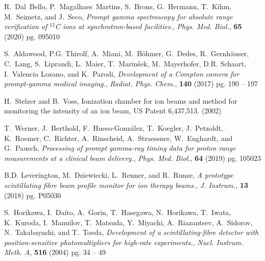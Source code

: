 \documentclass[a4paper,11pt]{article}
\begin{document}
\begin{thebibliography}{99}
R.~Dal~Bello, P.~Magalhaes~Martins, S.~Brons, G.~Hermann, T.~Kihm, M.~Seimetz, and J.~Seco, \emph{Prompt gamma spectroscopy for absolute range verification of $^{12}${C} ions at synchrotron-based facilities.}, \emph{Phys. Med. Biol.}, \textbf{65} (2020) pg. 095010

S.~Aldawood, P.G. Thirolf, A.~Miani, M.~Böhmer, G.~Dedes, R.~Gernhäuser,
  C.~Lang, S.~Liprandi, L.~Maier, T.~Marinšek, M.~Mayerhofer, D.R. Schaart,
  I.~Valencia Lozano, and K.~Parodi, \emph{Development of a {C}ompton camera for prompt-gamma medical imaging.}, \emph{Radiat. Phys. Chem.}, \textbf{140} (2017) pg. 190 -- 197

H.~Stelzer and B.~Voss, Ionization chamber for ion beams and method for monitoring the intensity of an ion beam, US Patent 6,437,513. (2002)

T.~Werner, J.~Berthold, F.~Hueso-Gonz{\'{a}}lez, T.~Koegler, J.~Petzoldt,
  K.~Roemer, C.~Richter, A.~Rinscheid, A.~Straessner, W.~Enghardt, and
  G.~Pausch, \emph{Processing of prompt gamma-ray timing data for proton range measurements at a clinical beam delivery.}, \emph{Phys. Med. Biol.}, \textbf{64} (2019) pg. 105023

B.D. Leverington, M.~Dziewiecki, L.~Renner, and R.~Runze, \emph{A prototype scintillating fibre beam profile monitor for ion therapy beams.}, \emph{J. Instrum.}, \textbf{13} (2018) pg. P05030

S.~Horikawa, I.~Daito, A.~Gorin, T.~Hasegawa, N.~Horikawa, T.~Iwata, K.~Kuroda,
  I.~Manuilov, T.~Matsuda, Y.~Miyachi, A.~Riazantsev, A.~Sidorov,
  N.~Takabayashi, and T.~Toeda, \emph{Development of a scintillating-fibre detector with position-sensitive photomultipliers for high-rate experiments.}, \emph{Nucl. Instrum. Meth. A}, \textbf{516} (2004) pg. 34
  -- 49


\end{thebibliography}
\end{document}
